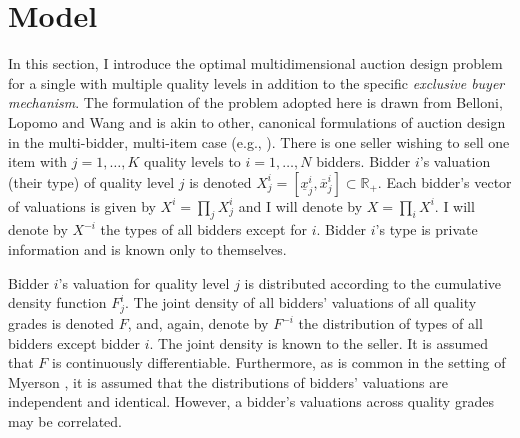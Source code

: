 


\section{Model}\label{sec_model}

In this section, I introduce the optimal multidimensional auction design problem for a single with multiple quality levels in addition to the specific \textit{exclusive buyer mechanism}. The formulation of the problem adopted here is drawn from Belloni, Lopomo and Wang \autocite*{belloni2010multidimensional} and is akin to other, canonical formulations of auction design in the multi-bidder, multi-item case (e.g., \cite{cai2016}). There is one seller wishing to sell one item with $j = 1,\dots,K$ quality levels to $i=1,\dots,N$ bidders. Bidder $i$'s valuation (their type) of quality level $j$ is denoted $X_j^i = [\underline{x}_j^i, \overline{x}_j^i] \subset \mathbb{R}_+$. Each bidder's vector of valuations is given by $X^i = \prod_j X_j^i$ and I will denote by $X = \prod_i X^i$. I will denote by $X^{-i}$ the types of all bidders except for $i$. Bidder $i$'s type is private information and is known only to themselves. 

Bidder $i$'s valuation for quality level $j$ is distributed according to the cumulative density function $F_j^i$. The joint density of all bidders' valuations of all quality grades is denoted $F$, and, again, denote by $F^{-i}$ the distribution of types of all bidders except bidder $i$. The joint density is known to the seller. It is assumed that $F$ is continuously differentiable. Furthermore, as is common in the setting of Myerson \autocite*{myerson1981optimal}, it is assumed that the distributions of bidders' valuations are independent and identical. However, a bidder's valuations across quality grades may be correlated.


